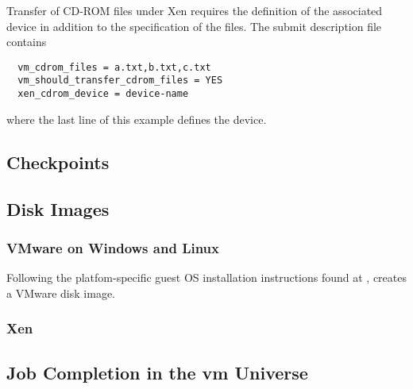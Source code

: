 Transfer of CD-ROM files under Xen requires the definition of
the associated device in addition to the specification of the
files.
The submit description file contains
\begin{verbatim}
  vm_cdrom_files = a.txt,b.txt,c.txt
  vm_should_transfer_cdrom_files = YES
  xen_cdrom_device = device-name
\end{verbatim}
where the last line of this example defines the device.




\subsection{\label{sec:vm-checkpoints}Checkpoints}
\Todo

\subsection{\label{sec:vm-disk-image-details}Disk Images}

\subsubsection{\label{sec:vm-disk-image-details-vmware}
VMware on Windows and Linux}



Following the platfom-specific
guest OS installation instructions found at
,
creates a VMware disk image.

\subsubsection{\label{sec:vm-disk-image-details-xen}Xen}
\Todo

\subsection{\label{sec:vm-job-completion-details}Job Completion in the vm Universe}

